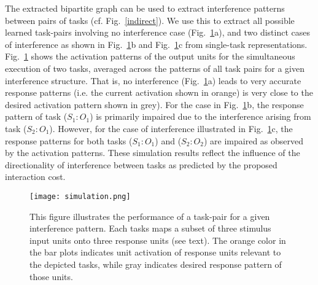 \documentclass[10pt,letterpaper]{article}
\begin{document}
The extracted bipartite graph can be used to extract interference patterns between pairs of tasks (cf. Fig.~\ref{indirect}).  We use this to extract all possible learned task-pairs involving no interference case (Fig.~\ref{simulation}a), and two distinct cases of interference as shown in Fig.~\ref{simulation}b and Fig.~\ref{simulation}c from single-task representations. Fig.~\ref{simulation} shows the activation patterns of the output units for the simultaneous execution of two tasks, averaged across the patterns of all task pairs for a given interference structure. That is, no interference (Fig.~\ref{simulation}a) leads to very accurate response patterns (i.e. the current activation shown in orange) is very close to the desired activation pattern shown in grey). For the case in Fig.~\ref{simulation}b, the response pattern of task ($S_1:O_1$) is primarily impaired due to the interference arising from task ($S_2:O_1$). However, for the case of interference illustrated in Fig.~\ref{simulation}c, the response patterns for both tasks ($S_1:O_1$) and ($S_2:O_2$) are impaired as observed by the activation patterns. These simulation results reflect the influence of the directionality of interference between tasks as predicted by the proposed interaction cost.
%
\begin{figure}[htb]
\begin{center}
  \texttt{[image: simulation.png]}
  \caption{\small{This figure illustrates the performance of a task-pair for a given interference pattern. Each tasks maps a subset of three stimulus input units onto three response units (see text). The orange color in the bar plots indicates unit activation of response units relevant to the depicted tasks, while gray indicates desired response pattern of those units.}}
  \label{simulation}
\end{center}
\vspace{-1.5em}
\end{figure}
%
%
%

%
%
\end{document}
